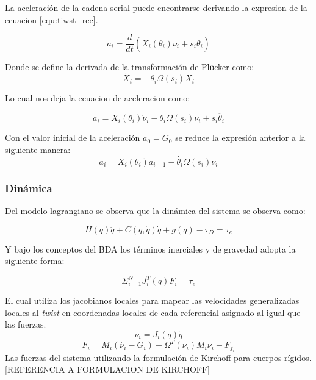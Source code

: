 \documentclass[letterpaper, 12pt]{article}
\begin{document}
La aceleración de la cadena serial puede encontrarse derivando la expresion de la ecuacion \ref{equ:tiwst_rec}.

\begin{equation}
a_i = \frac{d}{dt} (X_i(\theta_i)\nu_i + s_i\dot{\theta_i})
\end{equation}

Donde se define la derivada de la transformación de Plücker como:
\begin{equation}
\dot{X_i} = -\theta_i \Omega(s_i)X_i
\end{equation}

Lo cual nos deja la ecuacion de aceleracion como:

\begin{equation}
a_i = X_i(\theta_i)\dot{\nu}_i - \theta_i \Omega(s_i)\nu_i+ s_i\ddot{\theta_i}
\end{equation}

Con el valor inicial de la aceleración $a_0 = G_0$ se reduce la expresión anterior a la siguiente manera:
\begin{equation}
a_i = X_i(\theta_i)a_{i-1} - \dot{\theta_i}\Omega(s_i)\nu_i
\end{equation}

\subsubsection{Dinámica}

Del modelo lagrangiano se observa que la dinámica del sistema se observa como:

\begin{equation}\label{equ:lagrangiano_modelo}
H(q)\ddot{q} + C(q,\dot{q})\dot{q} +g(q) - \tau_D = \tau_e
\end{equation}

Y bajo los conceptos del BDA los términos inerciales y de gravedad adopta la siguiente forma:

\begin{equation}
\Sigma_{i=1}^N J_i^T(q)F_i = \tau_e
\end{equation}

El cual utiliza los jacobianos locales para mapear las velocidades generalizadas locales al \emph{twist} en coordenadas locales de cada referencial asignado al igual que las fuerzas.
\begin{equation} \label{equ:twist_loc}
\nu_i = J_i(q)\dot{q}
\end{equation}
\begin{equation}
F_i = M_i(\dot{\nu_i} - G_i) - \Omega^T(\nu_i)M_i\nu_i - F_{f_{i}}
\end{equation}
Las fuerzas del sistema utilizando la formulación de Kirchoff para cuerpos rígidos.[REFERENCIA A FORMULACION DE KIRCHOFF]
\end{document}
